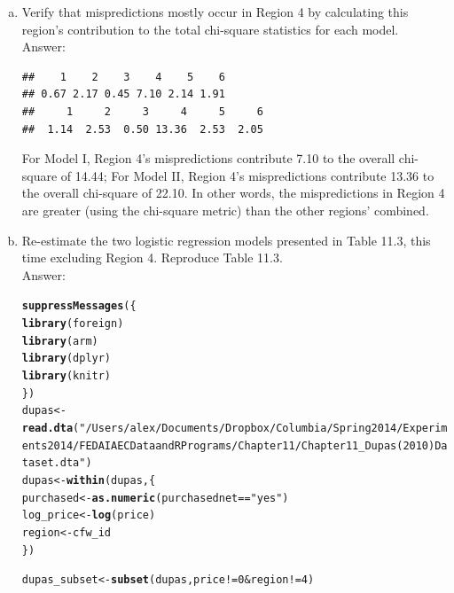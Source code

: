 \documentclass[11pt,notitlepage]{article}\usepackage[]{graphicx}\usepackage[]{color}
\makeatletter
\newcommand{\hlnum}[1]{\textcolor[rgb]{0.686,0.059,0.569}{#1}}%
\newcommand{\hlstr}[1]{\textcolor[rgb]{0.192,0.494,0.8}{#1}}%
\newcommand{\hlopt}[1]{\textcolor[rgb]{0,0,0}{#1}}%
\newcommand{\hlstd}[1]{\textcolor[rgb]{0.345,0.345,0.345}{#1}}%
\newcommand{\hlkwb}[1]{\textcolor[rgb]{0.69,0.353,0.396}{#1}}%
\newcommand{\hlkwd}[1]{\textcolor[rgb]{0.737,0.353,0.396}{\textbf{#1}}}%
\newenvironment{kframe}{%
 \def\at@end@of@kframe{}%
 \ifinner\ifhmode%
  \def\at@end@of@kframe{\end{minipage}}%
  \begin{minipage}{\columnwidth}%
 \fi\fi%
 \def\FrameCommand##1{\hskip\@totalleftmargin \hskip-\fboxsep
 \colorbox{shadecolor}{##1}\hskip-\fboxsep
     \hskip-\linewidth \hskip-\@totalleftmargin \hskip\columnwidth}%
 \MakeFramed {\advance\hsize-\width
   \@totalleftmargin\z@ \linewidth\hsize
   \@setminipage}}%
 {\par\unskip\endMakeFramed%
 \at@end@of@kframe}
\newenvironment{knitrout}{}{} %
\makeatother
\begin{document}
\begin{enumerate}[a)]
\item Verify that mispredictions mostly occur in Region 4 by calculating this region's contribution to the total chi-square statistics for each model.\\
Answer:\\
\begin{knitrout}
\color{fgcolor}\begin{kframe}
\begin{verbatim}
##    1    2    3    4    5    6 
## 0.67 2.17 0.45 7.10 2.14 1.91
##     1     2     3     4     5     6 
##  1.14  2.53  0.50 13.36  2.53  2.05
\end{verbatim}
\end{kframe}
\end{knitrout}

For Model I, Region 4's mispredictions contribute 7.10 to the overall chi-square of 14.44; For Model II, Region 4's mispredictions contribute 13.36 to the overall chi-square of 22.10.  In other words, the mispredictions in Region 4 are greater (using the chi-square metric) than the other regions' combined.

\item Re-estimate the two logistic regression models presented in Table 11.3, this time excluding Region 4. Reproduce Table 11.3.\\
Answer:\\

\begin{knitrout}
\color{fgcolor}\begin{kframe}
\begin{alltt}
\hlkwd{suppressMessages}\hlstd{(\{}
  \hlkwd{library}\hlstd{(foreign)}
  \hlkwd{library}\hlstd{(arm)}
  \hlkwd{library}\hlstd{(dplyr)}
  \hlkwd{library}\hlstd{(knitr)}
\hlstd{\})}
\hlstd{dupas} \hlkwb{<-} \hlkwd{read.dta}\hlstd{(}\hlstr{"/Users/alex/Documents/Dropbox/Columbia/Spring 2014/Experiments2014/FEDAI AEC Data and R Programs/Chapter 11/Chapter 11_Dupas (2010) Dataset.dta"}\hlstd{)}
\hlstd{dupas} \hlkwb{<-} \hlkwd{within}\hlstd{(dupas,\{}
  \hlstd{purchased} \hlkwb{<-} \hlkwd{as.numeric}\hlstd{(purchasednet} \hlopt{==}\hlstr{"yes"}\hlstd{)}
  \hlstd{log_price} \hlkwb{<-} \hlkwd{log}\hlstd{(price)}
  \hlstd{region} \hlkwb{<-} \hlstd{cfw_id}
\hlstd{\})}

\hlstd{dupas_subset} \hlkwb{<-} \hlkwd{subset}\hlstd{(dupas, price} \hlopt{!=}\hlnum{0} \hlopt{&} \hlstd{region}\hlopt{!=}\hlnum{4}\hlstd{)}


\end{alltt}
\end{kframe}
\end{knitrout}
\end{enumerate}
\end{document}

